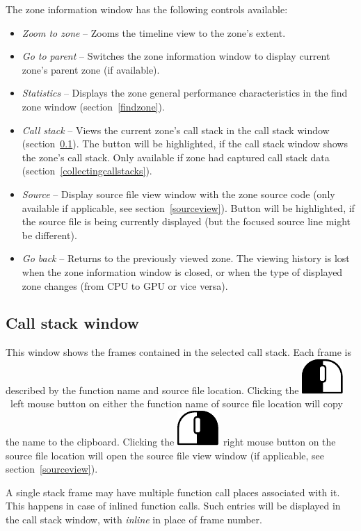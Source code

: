 \documentclass[hidelinks,titlepage,a4paper]{article}
\newcommand{\LMB}{\includegraphics[height=.8\baselineskip]{icons/lmb}}
\newcommand{\RMB}{\includegraphics[height=.8\baselineskip]{icons/rmb}}
\begin{document}
The zone information window has the following controls available:

\begin{itemize}
\item \emph{\faMicroscope{} Zoom to zone} -- Zooms the timeline view to the zone's extent.
\item \emph{\faArrowUp{} Go to parent} -- Switches the zone information window to display current zone's parent zone (if available).
\item \emph{\faChartBar{} Statistics} -- Displays the zone general performance characteristics in the find zone window (section~\ref{findzone}).
\item \emph{\faAlignJustify{} Call stack} -- Views the current zone's call stack in the call stack window (section~\ref{callstackwindow}). The button will be highlighted, if the call stack window shows the zone's call stack. Only available if zone had captured call stack data (section~\ref{collectingcallstacks}).
\item \emph{\faFile*{} Source} -- Display source file view window with the zone source code (only available if applicable, see section~\ref{sourceview}). Button will be highlighted, if the source file is being currently displayed (but the focused source line might be different).
\item \emph{\faArrowLeft{} Go back} -- Returns to the previously viewed zone. The viewing history is lost when the zone information window is closed, or when the type of displayed zone changes (from CPU to GPU or vice versa).
\end{itemize}

\subsection{Call stack window}
\label{callstackwindow}

This window shows the frames contained in the selected call stack. Each frame is described by the function name and source file location. Clicking the \LMB{}~left mouse button on either the function name of source file location will copy the name to the clipboard. Clicking the \RMB{}~right mouse button on the source file location will open the source file view window (if applicable, see section~\ref{sourceview}).

A single stack frame may have multiple function call places associated with it. This happens in case of inlined function calls. Such entries will be displayed in the call stack window, with \emph{inline} in place of frame number.
\end{document}
